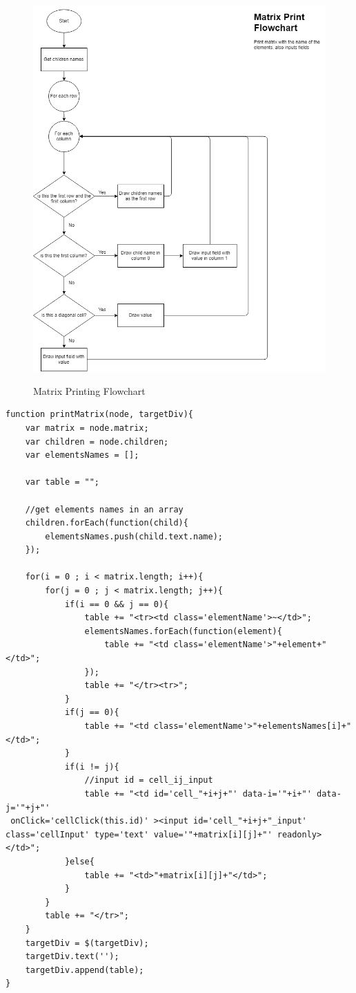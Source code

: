 \documentclass[11pt]{article} %
\begin{document}
\begin{figure}[H]
  \caption{Matrix Printing Flowchart}
  \centering
  \includegraphics[width=\textwidth]{printMatrix}
  \label{diagram:printMatrix}
\end{figure}

\noindent
\begin{minipage}[c]{\linewidth}
\begin{lstlisting}[basicstyle=\scriptsize, tabsize=4, frame=single, caption=printMatrix Function, label=code:printMatrix]
function printMatrix(node, targetDiv){
	var matrix = node.matrix;
	var children = node.children;
	var elementsNames = [];
	
	var table = "";
	
	//get elements names in an array
	children.forEach(function(child){
		elementsNames.push(child.text.name);
	});
	
	for(i = 0 ; i < matrix.length; i++){
		for(j = 0 ; j < matrix.length; j++){
			if(i == 0 && j == 0){
				table += "<tr><td class='elementName'>~</td>";
				elementsNames.forEach(function(element){
					table += "<td class='elementName'>"+element+"</td>";
				});
				table += "</tr><tr>";
			}
			if(j == 0){
				table += "<td class='elementName'>"+elementsNames[i]+"</td>";
			}
			if(i != j){
				//input id = cell_ij_input
				table += "<td id='cell_"+i+j+"' data-i='"+i+"' data-j='"+j+"'
 onClick='cellClick(this.id)' ><input id='cell_"+i+j+"_input' class='cellInput' type='text' value='"+matrix[i][j]+"' readonly></td>";
			}else{
				table += "<td>"+matrix[i][j]+"</td>";
			}	
		}
		table += "</tr>";
	}
	targetDiv = $(targetDiv);
	targetDiv.text('');
	targetDiv.append(table);
}

\end{lstlisting}
\end{minipage}
\end{document}
